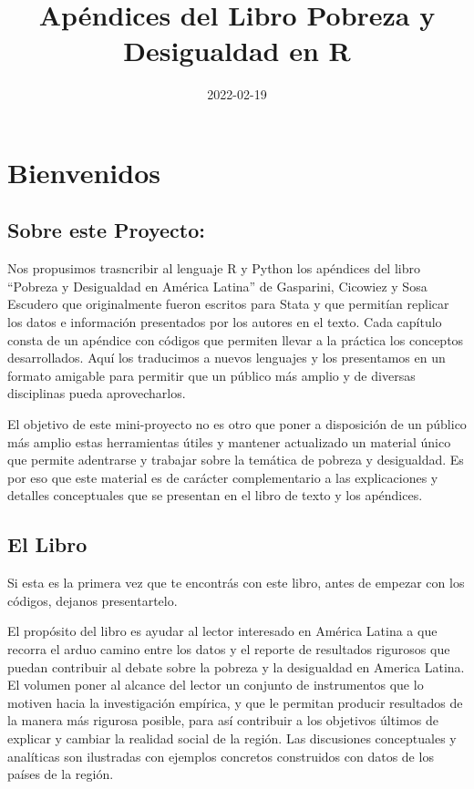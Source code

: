 \documentclass[
]{book}
\title{Apéndices del Libro Pobreza y Desigualdad en R}
\author{}
\date{\vspace{-2.5em}2022-02-19}
\begin{document}
\maketitle

{
\setcounter{tocdepth}{1}
\tableofcontents
}
\hypertarget{bienvenidos}{%
\chapter{Bienvenidos}\label{bienvenidos}}

\hypertarget{sobre-este-proyecto}{%
\section*{Sobre este Proyecto:}\label{sobre-este-proyecto}}

Nos propusimos trasncribir al lenguaje R y Python los apéndices del libro ``Pobreza y Desigualdad en América Latina'' de Gasparini, Cicowiez y Sosa Escudero que originalmente fueron escritos para Stata y que permitían replicar los datos e información presentados por los autores en el texto. Cada capítulo consta de un apéndice con códigos que permiten llevar a la práctica los conceptos desarrollados. Aquí los traducimos a nuevos lenguajes y los presentamos en un formato amigable para permitir que un público más amplio y de diversas disciplinas pueda aprovecharlos.

El objetivo de este mini-proyecto no es otro que poner a disposición de un público más amplio estas herramientas útiles y mantener actualizado un material único que permite adentrarse y trabajar sobre la temática de pobreza y desigualdad. Es por eso que este material es de carácter complementario a las explicaciones y detalles conceptuales que se presentan en el libro de texto y los apéndices.

\hypertarget{el-libro}{%
\section*{El Libro}\label{el-libro}}

Si esta es la primera vez que te encontrás con este libro, antes de empezar con los códigos, dejanos presentartelo.

El propósito del libro es ayudar al lector interesado en América Latina a que recorra el arduo camino entre los datos y el reporte de resultados rigurosos que puedan contribuir al debate sobre la pobreza y la desigualdad en America Latina. El volumen poner al alcance del lector un conjunto de instrumentos que lo motiven hacia la investigación empírica, y que le permitan producir resultados de la manera más rigurosa posible, para así contribuir a los objetivos últimos de explicar y cambiar la realidad social de la región. Las discusiones conceptuales y analíticas son ilustradas con ejemplos concretos construidos con datos de los países de la región.
\end{document}
